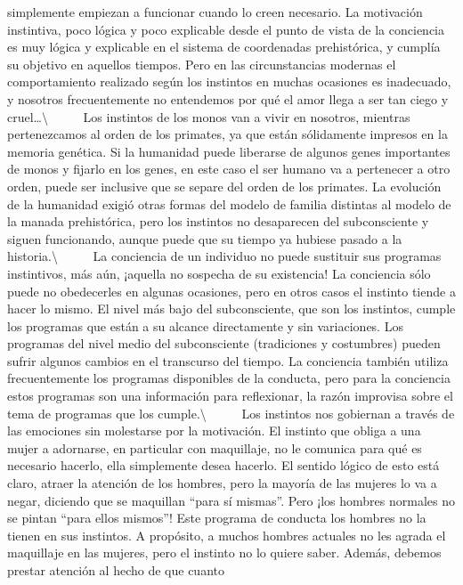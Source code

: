 simplemente empiezan a funcionar cuando lo creen necesario. La
motivación instintiva, poco lógica y poco explicable desde el punto de
vista de la conciencia es muy lógica y explicable en el sistema de
coordenadas prehistórica, y cumplía su objetivo en aquellos tiempos.
Pero en las circunstancias modernas el comportamiento realizado según
los instintos en muchas ocasiones es inadecuado, y nosotros
frecuentemente no entendemos por qué el amor llega a ser tan ciego y
cruel\ldots{}\textbackslash{} ~ ~ ~ Los instintos de los monos van a
vivir en nosotros, mientras pertenezcamos al orden de los primates, ya
que están sólidamente impresos en la memoria genética. Si la humanidad
puede liberarse de algunos genes importantes de monos y fijarlo en los
genes, en este caso el ser humano va a pertenecer a otro orden, puede
ser inclusive que se separe del orden de los primates. La evolución de
la humanidad exigió otras formas del modelo de familia distintas al
modelo de la manada prehistórica, pero los instintos no desaparecen del
subconsciente y siguen funcionando, aunque puede que su tiempo ya
hubiese pasado a la historia.\textbackslash{} ~ ~ ~ La conciencia de un
individuo no puede sustituir sus programas instintivos, más aún,
¡aquella no sospecha de su existencia! La conciencia sólo puede no
obedecerles en algunas ocasiones, pero en otros casos el instinto tiende
a hacer lo mismo. El nivel más bajo del subconsciente, que son los
instintos, cumple los programas que están a su alcance directamente y
sin variaciones. Los programas del nivel medio del subconsciente
(tradiciones y costumbres) pueden sufrir algunos cambios en el
transcurso del tiempo. La conciencia también utiliza frecuentemente los
programas disponibles de la conducta, pero para la conciencia estos
programas son una información para reflexionar, la razón improvisa sobre
el tema de programas que los cumple.\textbackslash{} ~ ~ ~ Los instintos
nos gobiernan a través de las emociones sin molestarse por la
motivación. El instinto que obliga a una mujer a adornarse, en
particular con maquillaje, no le comunica para qué es necesario hacerlo,
ella simplemente desea hacerlo. El sentido lógico de esto está claro,
atraer la atención de los hombres, pero la mayoría de las mujeres lo va
a negar, diciendo que se maquillan ``para sí mismas''. Pero ¡los hombres
normales no se pintan ``para ellos mismos''! Este programa de conducta
los hombres no la tienen en sus instintos. A propósito, a muchos hombres
actuales no les agrada el maquillaje en las mujeres, pero el instinto no
lo quiere saber. Además, debemos prestar atención al hecho de que cuanto
